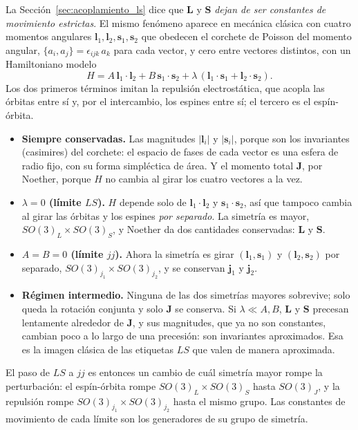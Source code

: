 \documentclass[11pt,a4paper]{article}
\begin{document}
La Sección~\ref{sec:acoplamiento_ls} dice que $\mathbf{L}$ y $\mathbf{S}$ \emph{dejan de ser
constantes de movimiento estrictas}. El mismo fenómeno aparece en mecánica clásica con cuatro
momentos angulares $\mathbf{l}_1, \mathbf{l}_2, \mathbf{s}_1, \mathbf{s}_2$ que obedecen el
corchete de Poisson del momento angular, $\{a_i, a_j\} = \epsilon_{ijk}\,a_k$ para cada vector, y
cero entre vectores distintos, con un Hamiltoniano modelo
\begin{equation}
  H = A\,\mathbf{l}_1\cdot\mathbf{l}_2 + B\,\mathbf{s}_1\cdot\mathbf{s}_2
    + \lambda\,(\mathbf{l}_1\cdot\mathbf{s}_1 + \mathbf{l}_2\cdot\mathbf{s}_2).
\end{equation}
Los dos primeros términos imitan la repulsión electrostática, que acopla las órbitas entre sí y,
por el intercambio, los espines entre sí; el tercero es el espín-órbita.

\begin{itemize}
\item \textbf{Siempre conservadas.} Las magnitudes $|\mathbf{l}_i|$ y $|\mathbf{s}_i|$, porque son
los invariantes (casimires) del corchete: el espacio de fases de cada vector es una esfera de radio
fijo, con su forma simpléctica de área. Y el momento total $\mathbf{J}$, por Noether, porque $H$ no
cambia al girar los cuatro vectores a la vez.
\item \textbf{$\lambda = 0$ (límite $LS$).} $H$ depende solo de $\mathbf{l}_1\cdot\mathbf{l}_2$ y
$\mathbf{s}_1\cdot\mathbf{s}_2$, así que tampoco cambia al girar las órbitas y los espines
\emph{por separado}. La simetría es mayor, $SO(3)_L\times SO(3)_S$, y Noether da dos cantidades
conservadas: $\mathbf{L}$ y $\mathbf{S}$.
\item \textbf{$A = B = 0$ (límite $jj$).} Ahora la simetría es girar $(\mathbf{l}_1,\mathbf{s}_1)$ y
$(\mathbf{l}_2,\mathbf{s}_2)$ por separado, $SO(3)_{j_1}\times SO(3)_{j_2}$, y se conservan
$\mathbf{j}_1$ y $\mathbf{j}_2$.
\item \textbf{Régimen intermedio.} Ninguna de las dos simetrías mayores sobrevive; solo queda la
rotación conjunta y solo $\mathbf{J}$ se conserva. Si $\lambda \ll A, B$, $\mathbf{L}$ y $\mathbf{S}$
precesan lentamente alrededor de $\mathbf{J}$, y sus magnitudes, que ya no son constantes, cambian
poco a lo largo de una precesión: son invariantes aproximados. Esa es la imagen clásica de las
etiquetas $LS$ que valen de manera aproximada.
\end{itemize}

El paso de $LS$ a $jj$ es entonces un cambio de cuál simetría mayor rompe la perturbación: el
espín-órbita rompe $SO(3)_L\times SO(3)_S$ hasta $SO(3)_J$, y la repulsión rompe
$SO(3)_{j_1}\times SO(3)_{j_2}$ hasta el mismo grupo. Las constantes de movimiento de cada límite
son los generadores de su grupo de simetría.





\printbibliography[heading=bibintoc]
\end{document}

